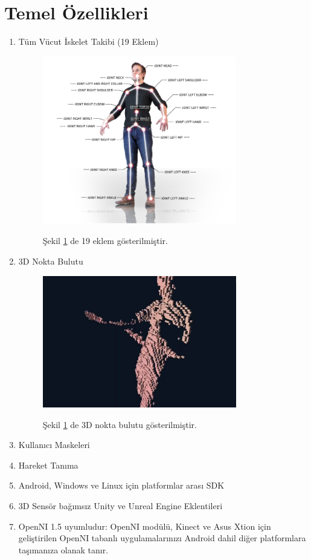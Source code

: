 \documentclass[12pt, a4paper]{article}
\begin{document}
	\section{Temel Özellikleri}
	\begin{enumerate}
		
		\item Tüm Vücut İskelet Takibi (19 Eklem)
		\begin{figure}[!ht]
			\caption{}
			\centering
			\includegraphics[width=0.8\textwidth]{Nuitrack.PNG}
			
			\label{dino1}
			Şekil \ref{dino1} de 19 eklem gösterilmiştir.\cite{3DiVi}	
		\end{figure}
		\newpage
		\item 3D Nokta Bulutu
		\begin{figure}[!ht]
			\caption{}
			\centering
			\includegraphics[width=0.8\textwidth]{Nuitrack1.jpg}
			
			\label{dino}
			Şekil \ref{dino1} de 3D nokta bulutu gösterilmiştir.\cite{3dPointCloud}	
		\end{figure}
		\item Kullanıcı Maskeleri
		\item Hareket Tanıma
		\item Android, Windows ve Linux için platformlar arası SDK
		\item 3D Sensör bağımsız Unity ve Unreal Engine Eklentileri
		\item OpenNI 1.5 uyumludur: OpenNI modülü, Kinect ve Asus Xtion için geliştirilen OpenNI tabanlı uygulamalarınızı Android dahil diğer platformlara taşımanıza olanak tanır.
		
	\end{enumerate}
	
\end{document}
